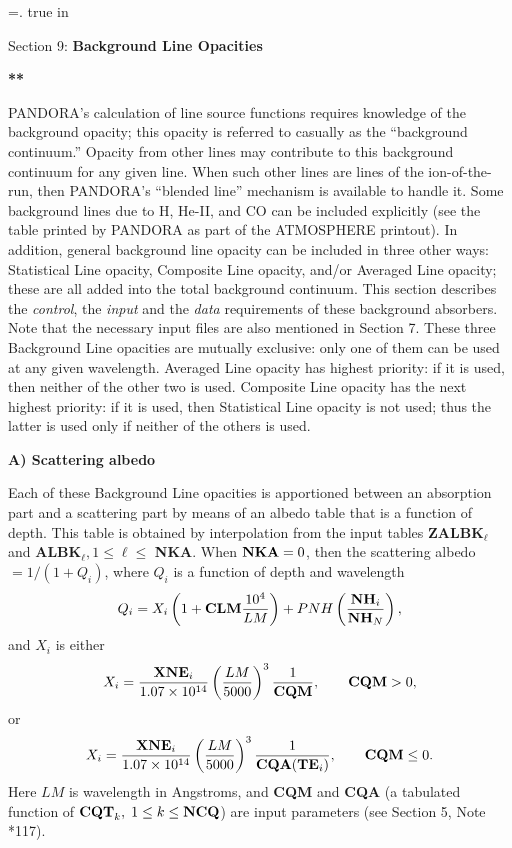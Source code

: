 %
\newtoks\footline \footline={\hss{}.\folio\hss}
\top
{} true in
\centerline{Section 9: {\bf Background Line Opacities}}
\blankline
\blankline
\centerline{\bf ***}
\blankline
\blankline
PANDORA's calculation of line source functions requires knowledge of
the background opacity; this opacity is referred to casually as the
``background continuum.'' Opacity from other lines may contribute
to this background continuum for any given line. When such other
lines are lines of the ion-of-the-run, then PANDORA's ``blended
line'' mechanism is available to handle it. Some background lines
due to H, He-II, and CO can be included explicitly (see the table printed
by PANDORA as part of the ATMOSPHERE printout). In addition, general
background line opacity can be included in three other ways:
Statistical Line opacity, Composite Line opacity, and/or Averaged
Line opacity; these are all added into the total background continuum.
\blankline
This section describes the {\it control}, the {\it input}
and the {\it data} requirements of these background absorbers.
Note that the necessary input files are also mentioned in Section 7.
\blankline
These three Background Line opacities are mutually exclusive: only one
of them can be used at any given wavelength. Averaged Line opacity has
highest priority: if it is used, then neither of the other two is used.
Composite Line opacity has the next highest priority: if it is used, then
Statistical Line opacity is not used; thus the latter is used only if
neither of the others is used.
\ej
\centerline{\bf A) Scattering albedo}
\blankline
Each of these Background Line
opacities is apportioned between an absorption part and a
scattering part by means of an albedo table that is a function of depth.
This table is obtained by interpolation from the input tables
{\bf ZALBK}$_\ell$ and {\bf ALBK}$_\ell, 1 \leq \ell \leq$ {\bf NKA}.
\blankline
When ${\bf NKA} = 0$, then the scattering albedo $= 1 / (1+Q_i)$, where
$Q_i$ is a function of depth and wavelength
%
$$ Q_i = X_i \left( 1 + {\bf CLM} { 10^4 \over LM } \right) + PNH
         \left( {{\bf NH}_i \over {\bf NH}_N} \right) ,
$$
%
and $X_i$ is either
%
$$ X_i = {{\bf XNE}_i \over 1.07 \times 10^{14} }
\left( {LM \over 5000} \right)^3 { 1 \over {\bf CQM} }, 
\qquad {\bf CQM} > 0 ,
$$
%
or
%
$$ X_i = {{\bf XNE}_i \over 1.07 \times 10^{14} }
\left( {LM \over 5000} \right)^3 { 1 \over {\bf CQA}({\bf TE}_i) }, 
\qquad {\bf CQM} \leq 0 .
$$
%
Here $LM$ is wavelength in Angstroms, and {\bf CQM} and {\bf CQA}
(a tabulated function of ${\bf CQT}_k, \; 1 \leq k \leq {\bf NCQ}$)
are input parameters (see Section 5, Note *117).

